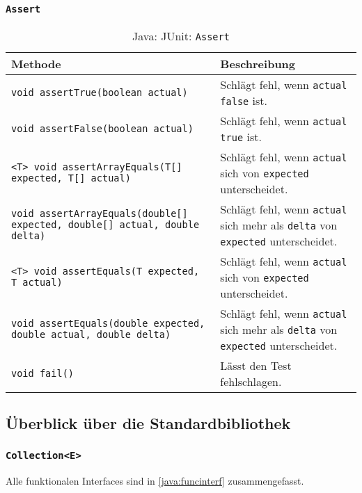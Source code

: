         \subsubsection{\texttt{Assert}}
            \begin{sidewaystable}
                \centering
                \begin{tabular}{l | p{8cm}}
                    Methode & Beschreibung \\
                    \hline
                    \texttt{void assertTrue(boolean actual)} & Schlägt fehl, wenn \texttt{actual} \texttt{false} ist. \\
                    \texttt{void assertFalse(boolean actual)} & Schlägt fehl, wenn \texttt{actual} \texttt{true} ist. \\
                    \texttt{<T> void assertArrayEquals(T[] expected, T[] actual)} & Schlägt fehl, wenn \texttt{actual} sich von \texttt{expected} unterscheidet. \\
                    \texttt{void assertArrayEquals(double[] expected, double[] actual, double delta)} & Schlägt fehl, wenn \texttt{actual} sich mehr als \texttt{delta} von \texttt{expected} unterscheidet. \\
                    \texttt{<T> void assertEquals(T expected, T actual)} & Schlägt fehl, wenn \texttt{actual} sich von \texttt{expected} unterscheidet. \\
                    \texttt{void assertEquals(double expected, double actual, double delta)} & Schlägt fehl, wenn \texttt{actual} sich mehr als \texttt{delta} von \texttt{expected} unterscheidet. \\
                    \texttt{void fail()} & Lässt den Test fehlschlagen. \\
                \end{tabular}
                \caption{Java: JUnit: \texttt{Assert}}
            \end{sidewaystable}




    \subsection{Überblick über die Standardbibliothek}
        \subsubsection{\texttt{Collection<E>}}
            Alle funktionalen Interfaces sind in \ref{java:funcinterf} zusammengefasst.

